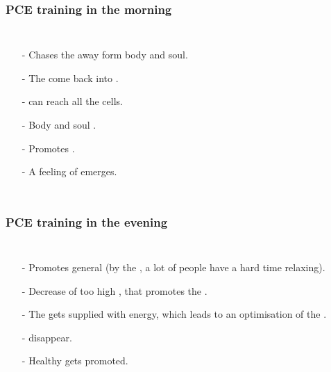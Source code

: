 \begin{frame}
\frametitle{PCE training in the morning}
\begin{columns}[c] %

\begin{itemize}
\item[-] Chases the  away form body and soul.
\item[-] The  come back into .
\item[-]  can reach all the cells.
\item[-] Body and soul .
\item[-] Promotes . 
\item[-] A feeling of  emerges.
\end{itemize}
\end{columns}
\end{frame}
\begin{frame}
\frametitle{PCE training in the evening}
\begin{columns}[c] %

\begin{itemize}
\item[-] Promotes general  (by the , a lot of people have a hard time relaxing).
\item[-] Decrease of too high , that promotes the .
\item[-] The  gets supplied with energy, which leads to an optimisation of the .
\item[-]  disappear.
\item[-] Healthy  gets promoted. %
\end{itemize}
\end{columns}
\end{frame}

